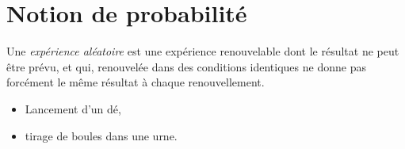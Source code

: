       \section{Notion de probabilit\'e}
            \begin{defi}
                  Une \emph{exp\'erience al\'eatoire} est une exp\'erience renouvelable
                  dont le r\'esultat ne peut \^etre pr\'evu, et qui, renouvel\'ee dans des conditions identiques
                  ne donne pas forc\'ement le m\^eme r\'esultat \`a chaque renouvellement.
                  \begin{ex}
                        \begin{itemize}
                              \item Lancement d'un d\'e,
                              \item tirage de boules dans une urne.
                        \end{itemize}
                  \end{ex}
            \end{defi}
